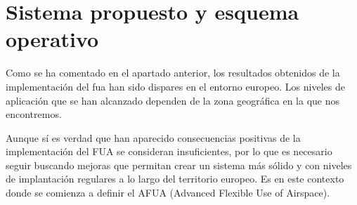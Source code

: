\chapter{Sistema propuesto y esquema operativo}

Como se ha comentado en el apartado anterior, los resultados obtenidos de la implementación del \acrfull{fua} han sido dispares en el entorno europeo. Los niveles de aplicación que se han alcanzado dependen de la zona geográfica en la que nos encontremos.

Aunque sí es verdad que han aparecido consecuencias positivas de la implementación del FUA se consideran insuficientes, por lo que es necesario seguir buscando mejoras que permitan crear un sistema más sólido y con niveles de implantación regulares a lo largo del territorio europeo. Es en este contexto donde se comienza a definir el AFUA (Advanced Flexible Use of Airspace).
